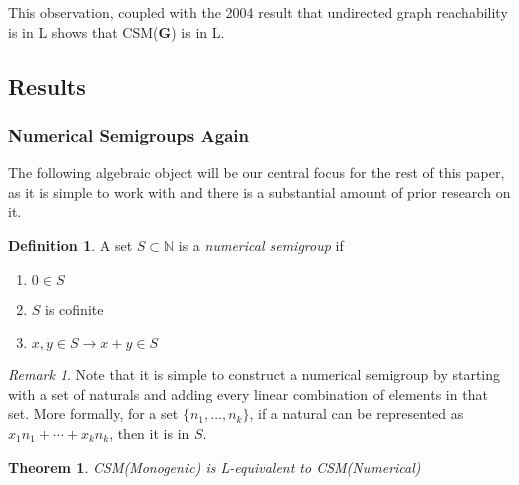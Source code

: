 \documentclass[a4paper,12pt]{article}
\theoremstyle{plain}
\newtheorem{theorem}{Theorem}
\theoremstyle{definition}
\newtheorem{defn}{Definition}
\theoremstyle{remark}
\newtheorem{remark}{Remark}
\begin{document}
This observation, coupled with the 2004 result that undirected graph reachability is in L \cite{10.1145/1391289.1391291} shows that CSM(\textbf{G}) is in L.

\subsection{Results}
\subsubsection{Numerical Semigroups Again}
The following algebraic object will be our central focus for the rest of this paper, as it is simple to work with and there is a substantial amount of prior research on it.
\begin{defn}
  A set $S\subset\mathbb{N}$ is a \textit{numerical semigroup} if 
  \begin{enumerate}
      \item $0\in S$
      \item $S$ is cofinite
      \item $x,y\in S\to x+y\in S$
  \end{enumerate}
\end{defn}
\begin{remark}
  Note that it is simple to construct a numerical semigroup by starting with a set of naturals and adding every linear combination of elements in that set. More formally, for a set $\{n_1,\dots,n_k\}$, if a natural can be represented as $x_1n_1+\cdots+x_kn_k$, then it is in $S$.
\end{remark}
\begin{theorem}
  CSM(Monogenic) is L-equivalent to CSM(Numerical)
\end{theorem}
\end{document}
